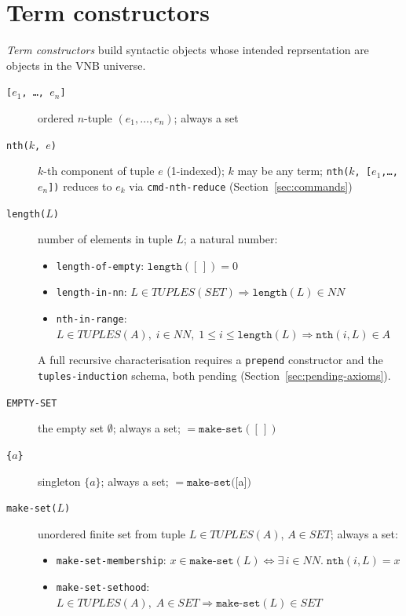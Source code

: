 \documentclass{amsbook}[openany]
\theoremstyle{definition}
\theoremstyle{remark}
\theoremstyle{remark}
\begin{document}
\section{Term constructors}
\label{sec:choice-iota-lambda}

\emph{Term constructors} build syntactic objects whose intended
reprsentation are objects in the VNB universe.

\begin{description}
\item[\texttt{[$e_1$, \ldots, $e_n$]}] ordered $n$-tuple $(e_1, \ldots, e_n)$; always a set
\item[\texttt{nth($k$, $e$)}] $k$-th component of tuple $e$ (1-indexed); $k$ may be any term;
  \texttt{nth($k$, [$e_1$,\ldots,$e_n$])} reduces to $e_k$ via
  \texttt{cmd-nth-reduce} (Section~\ref{sec:commands})
\item[\texttt{length($L$)}] number of elements in tuple $L$; a natural number:
  \begin{itemize}[label=$-$, leftmargin=1cm]
  \item \texttt{length-of-empty}: $\texttt{length}([\,]) = 0$
  \item \texttt{length-in-nn}: $L \in \mathit{TUPLES}(\mathit{SET}) \Rightarrow
    \texttt{length}(L) \in \mathit{NN}$
  \item \texttt{nth-in-range}: $L \in \mathit{TUPLES}(A),\; i \in \mathit{NN},\;
    1 \le i \le \texttt{length}(L) \Rightarrow \texttt{nth}(i,L) \in A$
  \end{itemize}
  A full recursive characterisation requires a \texttt{prepend} constructor
  and the \texttt{tuples-induction} schema, both pending
  (Section~\ref{sec:pending-axioms}).
\item[\texttt{EMPTY-SET}] the empty set $\emptyset$; always a set; $= \texttt{make-set}([\,])$
\item[\texttt{\{$a$\}}] singleton $\{a\}$; always a set; $= \texttt{make-set}([$a$])$
\item[\texttt{make-set($L$)}] unordered finite set from tuple $L \in \mathit{TUPLES}(A)$,
  $A \in \mathit{SET}$; always a set:
  \begin{itemize}[label=$-$, leftmargin=1cm]
  \item \texttt{make-set-membership}: $x \in \texttt{make-set}(L)
    \Longleftrightarrow \exists\,i \in \mathit{NN}.\; \texttt{nth}(i,L) = x$
  \item \texttt{make-set-sethood}: $L \in \mathit{TUPLES}(A),\; A \in \mathit{SET}
    \Rightarrow \texttt{make-set}(L) \in \mathit{SET}$

\end{itemize}
\end{description}
\end{document}
